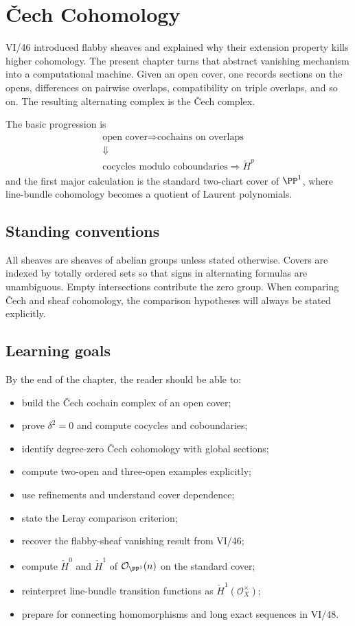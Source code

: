 \chapter{\v{C}ech Cohomology}
\label{ch:vi47-cech-cohomology}

VI/46 introduced flabby sheaves and explained why their extension property kills higher cohomology.  The present chapter turns that abstract vanishing mechanism into a computational machine.  Given an open cover, one records sections on the opens, differences on pairwise overlaps, compatibility on triple overlaps, and so on.  The resulting alternating complex is the \v{C}ech complex.

The basic progression is
\[
\boxed{\begin{gathered}
\text{open cover}\Longrightarrow\text{cochains on overlaps}\\
\Downarrow\\
\text{cocycles modulo coboundaries}\Longrightarrow\check H^p
\end{gathered}}
\]
and the first major calculation is the standard two-chart cover of $\PP^1$, where line-bundle cohomology becomes a quotient of Laurent polynomials.

\section*{Standing conventions}
All sheaves are sheaves of abelian groups unless stated otherwise.  Covers are indexed by totally ordered sets so that signs in alternating formulas are unambiguous.  Empty intersections contribute the zero group.  When comparing \v{C}ech and sheaf cohomology, the comparison hypotheses will always be stated explicitly.

\section*{Learning goals}
By the end of the chapter, the reader should be able to:
\begin{itemize}
\item build the \v{C}ech cochain complex of an open cover;
\item prove $\delta^2=0$ and compute cocycles and coboundaries;
\item identify degree-zero \v{C}ech cohomology with global sections;
\item compute two-open and three-open examples explicitly;
\item use refinements and understand cover dependence;
\item state the Leray comparison criterion;
\item recover the flabby-sheaf vanishing result from VI/46;
\item compute $\check H^0$ and $\check H^1$ of $\mathcal O_{\PP^1}(n)$ on the standard cover;
\item reinterpret line-bundle transition functions as $\check H^1(\mathcal O_X^\times)$;
\item prepare for connecting homomorphisms and long exact sequences in VI/48.
\end{itemize}

